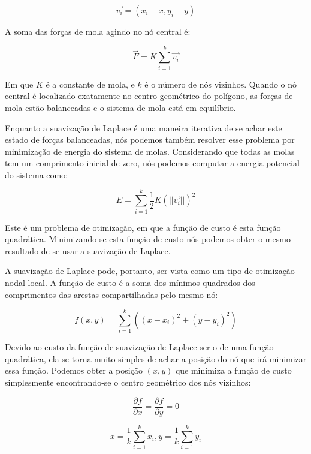 \begin{equation*}
    \vec{v_i} = (x_i - x, y_i - y)
\end{equation*}

A soma das forças de mola agindo no nó central é:

\begin{equation*}
    \vec{F} = K \sum_{i=1}^k \vec{v_i}
\end{equation*}

Em que $K$ é a constante de mola, e $k$ é o número de nós vizinhos. Quando o nó central é localizado exatamente no centro geométrico do polígono, as forças de mola estão balanceadas e o sistema de mola está em equilíbrio.

Enquanto a suavização de Laplace é uma maneira iterativa de se achar este estado de forças balanceadas, nós podemos também resolver esse problema por minimização de energia do sistema de molas. Considerando que todas as molas tem um comprimento inicial de zero, nós podemos computar a energia potencial do sistema como:

\begin{equation*}
    E = \sum_{i=1}^k \frac{1}{2} K (||\vec{v_i}||)^2
\end{equation*}

Este é um problema de otimização, em que a função de custo é esta função quadrática. Minimizando-se esta função de custo nós podemos obter o mesmo resultado de se usar a suavização de Laplace.


A suavização de Laplace pode, portanto, ser vista como um tipo de otimização nodal local. A função de custo é a soma dos mínimos quadrados dos comprimentos das arestas compartilhadas pelo mesmo nó:

\begin{equation*}
    f(x,y) = \sum_{i=1}^k ((x-x_i)^2 + (y-y_i)^2)
\end{equation*}

Devido ao custo da função de suavização de Laplace ser o de uma função quadrática, ela se torna muito simples de achar a posição do nó que irá minimizar essa função. Podemos obter a posição $(x,y)$ que minimiza a função de custo simplesmente encontrando-se o centro geométrico dos nós vizinhos:

\begin{equation*}
    \frac{\partial f}{\partial x} = \frac{\partial f}{\partial y} = 0
\end{equation*}

\begin{equation*}
    x = \frac{1}{k} \sum_{i=1}^k x_i, y = \frac{1}{k} \sum_{i=1}^k y_i
\end{equation*}

